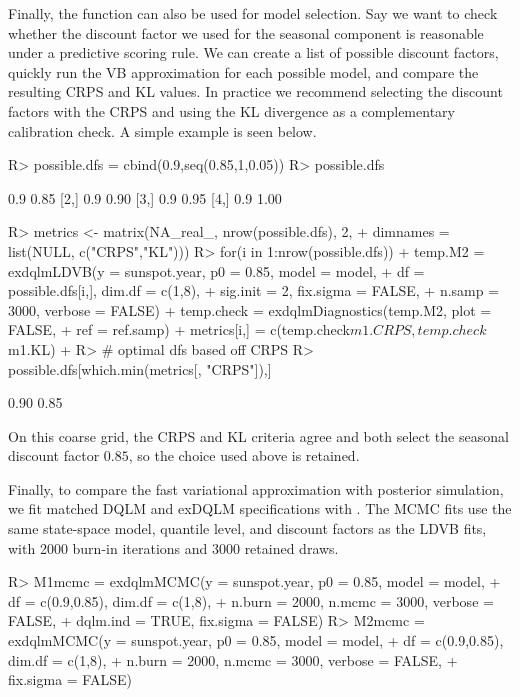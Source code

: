 \documentclass[jss]{jss}
\begin{document}
Finally, the function  can also be used for model selection. Say we want to check whether the discount factor we used for the seasonal component is reasonable under a predictive scoring rule. We can create a list of possible discount factors, quickly run the VB approximation for each possible model, and compare the resulting CRPS and KL values. In practice we recommend selecting the discount factors with the CRPS and using the KL divergence as a complementary calibration check. A simple example is seen below.

\begin{CodeChunk}
\begin{CodeInput}
R> possible.dfs = cbind(0.9,seq(0.85,1,0.05))
R> possible.dfs
\end{CodeInput}
\begin{CodeOutput}
     [,1] [,2]
[1,]  0.9 0.85
[2,]  0.9 0.90
[3,]  0.9 0.95
[4,]  0.9 1.00
\end{CodeOutput}
\begin{CodeInput}
R> metrics <- matrix(NA_real_, nrow(possible.dfs), 2,
+                    dimnames = list(NULL, c("CRPS","KL")))
R> for(i in 1:nrow(possible.dfs)){
+   temp.M2 = exdqlmLDVB(y = sunspot.year, p0 = 0.85, model = model,
+                  df = possible.dfs[i,], dim.df = c(1,8),
+                  sig.init = 2, fix.sigma = FALSE,
+                  n.samp = 3000, verbose = FALSE)
+   temp.check = exdqlmDiagnostics(temp.M2, plot = FALSE,
+                              ref = ref.samp)
+   metrics[i,] = c(temp.check$m1.CRPS, temp.check$m1.KL)
+ }
R> # optimal dfs based off CRPS
R> possible.dfs[which.min(metrics[, "CRPS"]),]
\end{CodeInput}
\begin{CodeOutput}
[1] 0.90 0.85
\end{CodeOutput}
\end{CodeChunk}
On this coarse grid, the CRPS and KL criteria agree and both select the seasonal discount factor \(0.85\), so the choice used above is retained.

Finally, to compare the fast variational approximation with posterior simulation, we fit matched DQLM and exDQLM specifications with . The MCMC fits use the same state-space model, quantile level, and discount factors as the LDVB fits, with 2000 burn-in iterations and 3000 retained draws.

\begin{CodeChunk}
\begin{CodeInput}
R> M1mcmc = exdqlmMCMC(y = sunspot.year, p0 = 0.85, model = model,
+                df = c(0.9,0.85), dim.df = c(1,8),
+                n.burn = 2000, n.mcmc = 3000, verbose = FALSE,
+                dqlm.ind = TRUE, fix.sigma = FALSE)
R> M2mcmc = exdqlmMCMC(y = sunspot.year, p0 = 0.85, model = model,
+                df = c(0.9,0.85), dim.df = c(1,8),
+                n.burn = 2000, n.mcmc = 3000, verbose = FALSE,
+                fix.sigma = FALSE)
\end{CodeInput}
\end{CodeChunk}
\end{document}
